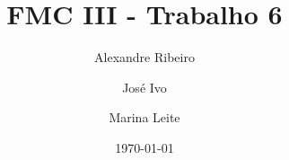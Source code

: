\documentclass[12pt]{article}
\begin{document}
\title{FMC III - Trabalho 6}
\author{Alexandre Ribeiro \and José Ivo \and Marina Leite}
\date{\today}

\maketitle




\end{document}
